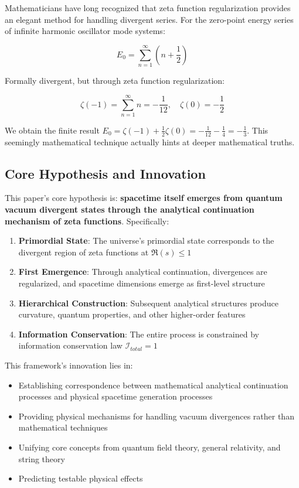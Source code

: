 \documentclass[12pt,a4paper]{article}
\begin{document}
Mathematicians have long recognized that zeta function regularization provides an elegant method for handling divergent series. For the zero-point energy series of infinite harmonic oscillator mode systems:

$$E_0 = \sum_{n=1}^{\infty} \left(n + \frac{1}{2}\right)$$

Formally divergent, but through zeta function regularization:

$$\zeta(-1) = \sum_{n=1}^{\infty} n = -\frac{1}{12}, \quad \zeta(0) = -\frac{1}{2}$$

We obtain the finite result $E_0 = \zeta(-1) + \frac{1}{2}\zeta(0) = -\frac{1}{12} - \frac{1}{4} = -\frac{1}{3}$. This seemingly mathematical technique actually hints at deeper mathematical truths.

\subsection{Core Hypothesis and Innovation}

This paper's core hypothesis is: \textbf{spacetime itself emerges from quantum vacuum divergent states through the analytical continuation mechanism of zeta functions}. Specifically:

\begin{enumerate}
\item \textbf{Primordial State}: The universe's primordial state corresponds to the divergent region of zeta functions at $\Re(s) \leq 1$
\item \textbf{First Emergence}: Through analytical continuation, divergences are regularized, and spacetime dimensions emerge as first-level structure
\item \textbf{Hierarchical Construction}: Subsequent analytical structures produce curvature, quantum properties, and other higher-order features
\item \textbf{Information Conservation}: The entire process is constrained by information conservation law $\mathcal{I}_{total} = 1$
\end{enumerate}

This framework's innovation lies in:
\begin{itemize}
\item Establishing correspondence between mathematical analytical continuation processes and physical spacetime generation processes
\item Providing physical mechanisms for handling vacuum divergences rather than mathematical techniques
\item Unifying core concepts from quantum field theory, general relativity, and string theory
\item Predicting testable physical effects
\end{itemize}
\end{document}
